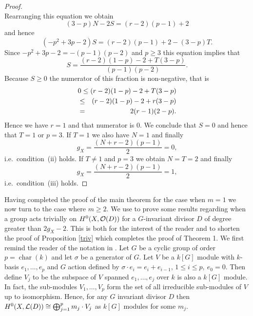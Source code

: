 \documentclass[11pt]{article} %
\newcommand{\cO}{{\cal O}}
\newcommand{\cL}{{\cal L}}
\DeclareMathOperator{\cha}{char}
\begin{document}
\begin{proof}
\[      \]
    Rearranging this equation we obtain
      \[
	 (3-p)N - 2S = (r-2)(p-1) +2  
      \]
    and hence
      \[
	 (-p^2 + 3p -2)S = (r-2)(p-1) +2 - (3-p)T.
      \]
    Since $-p^2+3p-2 = - (p-1)(p-2)$ and $p \ge 3$ this equation implies that
      \[ 
	S = \frac{(r-2)(1-p)-2 + T (3-p)}{(p-1)(p-2)}. 
      \]
    Because $S \ge 0$ the numerator of this fraction is non-negative, that is
      \begin{eqnarray*}
	\lefteqn{0 \le (r-2)(1-p) - 2 + T (3-p)}\\
	&\le & (r-2)(1-p) - 2 + r (3-p)\\
	&=& 2 (r-1)(2-p).
      \end{eqnarray*}
    Hence we have $r=1$ and that numerator is $0$. 
    We conclude that $S=0$ and hence that $T=1$ or $p=3$. 
    If $T=1$ we also have $N=1$ and finally
      \[
	g_X = \frac{(N+r-2)(p-1)}{2} = 0,
      \]
    i.e.\ condition~(ii) holds. 
    If $T \not=1$ and $p=3$ we obtain $N=T=2$ and finally 
      \[
	g_X = \frac{(N+r-2)(p-1)}{2} =1,
      \] 
    i.e.\
    condition~(iii) holds.
  \end{proof}

Having completed the proof of the main theorem for the case when $m=1$ we now turn to the case where $m\geq 2$.
We use \cite{Na} to prove some results regarding when a group acts trivially on $H^0(X,\cO(D))$ for a $G$-invariant divisor $D$ of degree greater than $2g_X-2$.
This is both for the interest of the reader and to shorten the proof of Proposition \ref{triv} which completes the proof of Theorem 1.
We first remind the reader of the notation in \cite{Na}.
Let $G$ be a cyclic group of order $p=\cha (k)$ and let $\sigma$ be a generator of $G$.
Let $V$ be a $k[G]$ module with $k$-basis $e_1,\ldots ,e_p$ and $G$ action defined by $\sigma\cdot e_i=e_i+e_{i-1}$, $1\leq i \leq p,\ e_0=0$.
Then define $V_j$ to be the subspace of $V$ spanned $e_1,\ldots ,e_j$ over $k$ is also a $k[G]$ module.
In fact, the sub-modules $V_1,\ldots ,V_p$ form the set of all irreducible sub-modules of $V$ up to isomorphism.
Hence, for any $G$ invariant divisor $D$ then $H^0(X,\cL (D))\cong \bigoplus_{j=1}^p m_j\cdot V_j$ as $k[G]$ modules for some $m_j$. \\
\end{document}
